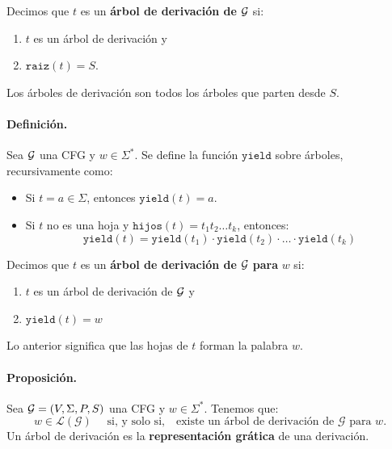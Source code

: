 Decimos que $t$ es un \textbf{árbol de derivación de} $\mathcal{G}$ si:
\begin{enumerate}
    \item $t$ es un árbol de derivación y
    \item $\texttt{raiz}(t) = S$.
\end{enumerate}
Los árboles de derivación son todos los árboles que parten desde $S$.


\paragraph{Definición.} Sea $\mathcal{G}$ una CFG y $w \in \Sigma^*$. Se define la función $\texttt{yield}$ sobre árboles, recursivamente como:
\begin{itemize}
    \item Si $t = a \in \Sigma$, entonces $\texttt{yield}(t) = a$.
    \item Si $t$ no es una hoja y $\texttt{hijos}(t) = t_1 t_2 \ldots t_k$, entonces:
          $$
              \texttt{yield}(t) =\texttt{yield}(t_1) \cdot \texttt{yield}(t_2) \cdot \ldots \cdot \texttt{yield}(t_k)
          $$
\end{itemize}

Decimos que $t$ es un \textbf{árbol de derivación de} $\mathcal{G}$ \textbf{para} $w$ si:
\begin{enumerate}
    \item $t$ es un árbol de derivación de $\mathcal{G}$ y
    \item $\texttt{yield}(t) = w$
\end{enumerate}
Lo anterior significa que las hojas de $t$ forman la palabra $w$.

\paragraph{Proposición.} Sea $\mathcal{G} = (V, \Sigma, P, S)$ una CFG y $w \in \Sigma^*$. Tenemos que:
$$
    w \in \mathcal{L}(\mathcal{G}) \quad \text { si, y solo si,} \quad \text{existe un árbol de derivación de } \mathcal{G} \text { para } w.
$$
Un árbol de derivación es la \textbf{representación grática} de una derivación.


